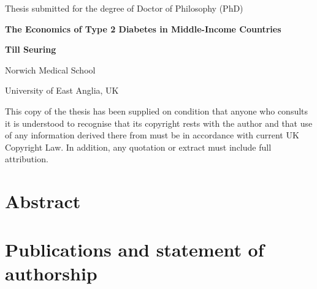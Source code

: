 


%
\date{\today}
\makeatletter
\begin{titlepage}
\centering
\vfill
Thesis submitted for the degree of Doctor of Philosophy (PhD)
\par
\vspace*{1in}
\begin{Large}\bfseries
The Economics of Type 2 Diabetes in Middle-Income Countries\par
\end{Large}
\vspace{1in}
\begin{large}\bfseries
Till Seuring\par
\end{large}
\par
\vspace{0.2in}
Norwich Medical School
\par
University of East Anglia, UK
\par
\vspace{1.0in}
\@date
\par
\vspace{2.0in}
This copy of the thesis has been supplied on condition that anyone who consults it is
understood to recognise that its copyright rests with the author and that use of any
information derived there from must be in accordance with current UK Copyright Law.
In addition, any quotation or extract must include full attribution.
\end{titlepage}
\makeatother

\cleardoublepage
{}
\chapter*{\label{abstract}Abstract}


\tableofcontents

\cleardoublepage
{}
\listoffigures

\cleardoublepage
{} 
\listoftables
\cleardoublepage

\chapter*{\label{publication_statement}Publications and statement of authorship}


